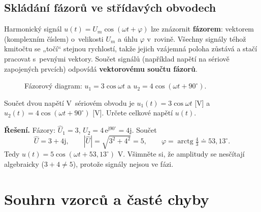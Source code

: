 \documentclass[a4paper,11pt]{article}
\newcommand{\abs}[1]{\left\lvert #1\right\rvert}
\newcommand{\dc}{{,}}                    %
\newcommand{\jimag}{\mathrm{j}}          %
\begin{document}
\subsection{Skládání fázorů ve střídavých obvodech}

\begin{ekt}
Harmonický signál $u(t)=U_m\cos(\omega t+\varphi)$ lze znázornit \textbf{fázorem}:
vektorem (komplexním číslem) o~velikosti $U_m$ a úhlu $\varphi$ v~rovině. Všechny
signály téhož kmitočtu se „točí“ stejnou rychlostí, takže jejich vzájemná poloha
zůstává a stačí pracovat s~pevnými vektory. Součet signálů (například napětí na
sériově zapojených prvcích) odpovídá \textbf{vektorovému součtu fázorů}.
\end{ekt}

\begin{figure}[!htbp]
\centering
{}
\caption{Fázorový diagram: $u_1=3\cos\omega t$ a $u_2=4\cos(\omega t+90^\circ)$.}
\end{figure}

\begin{priklad}{Součet dvou napětí}
V~sériovém obvodu je $u_1(t)=3\cos\omega t$ [V] a $u_2(t)=4\cos(\omega t+90^\circ)$ [V].
Určete celkové napětí $u(t)$.

\medskip\noindent\textbf{Řešení.} Fázory: $\hat U_1=3$, $\hat U_2=4\,\mathrm e^{\jimag90^\circ}=4\jimag$.
Součet
\[
  \hat U=3+4\jimag,\qquad \abs{\hat U}=\sqrt{3^2+4^2}=5,\qquad
  \varphi=\operatorname{arctg}\tfrac43\doteq53\dc13^\circ .
\]
Tedy $u(t)=5\cos(\omega t+53\dc13^\circ)$ V. Všimněte si, že amplitudy se nesčítají
algebraicky ($3+4\neq5$), protože signály nejsou ve fázi.
\end{priklad}

\section{Souhrn vzorců a časté chyby}
\end{document}
